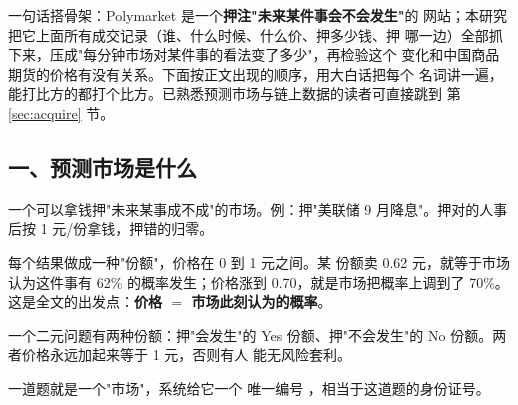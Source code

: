 一句话搭骨架：Polymarket 是一个\textbf{押注"未来某件事会不会发生"}的
网站；本研究把它上面所有成交记录（谁、什么时候、什么价、押多少钱、押
哪一边）全部抓下来，压成"每分钟市场对某件事的看法变了多少"，再检验这个
变化和中国商品期货的价格有没有关系。下面按正文出现的顺序，用大白话把每个
名词讲一遍，能打比方的都打个比方。已熟悉预测市场与链上数据的读者可直接跳到
第 \ref{sec:acquire} 节。

\subsection{一、预测市场是什么}
\begin{description}[style=nextline, leftmargin=1em]
\item[预测市场] 一个可以拿钱押"未来某事成不成"的市场。例：押"美联储
  9 月降息"。押对的人事后按 1 元/份拿钱，押错的归零。

\item[价格就是概率] 每个结果做成一种"份额"，价格在 0 到 1 元之间。某
  份额卖 0.62 元，就等于市场认为这件事有 62\% 的概率发生；价格涨到
  0.70，就是市场把概率上调到了 70\%。这是全文的出发点：\textbf{价格 $=$
  市场此刻认为的概率}。

\item[Yes 份额 / No 份额] 一个二元问题有两种份额：押"会发生"的 Yes
  份额、押"不会发生"的 No 份额。两者价格永远加起来等于 1 元，否则有人
  能无风险套利。

\item[市场、\code{condition\_id}] 一道题就是一个"市场"，系统给它一个
  唯一编号 ，相当于这道题的身份证号。
\end{description}

